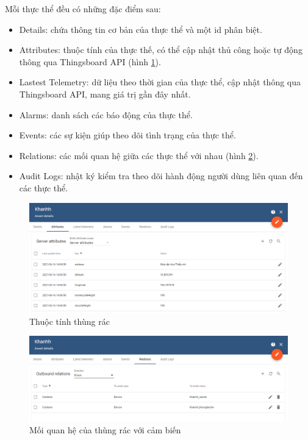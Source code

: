 Mỗi thực thể đều có những đặc điểm sau:
\begin{itemize}
    \item Details: chứa thông tin cơ bản của thực thể và một id phân biệt.
    \item Attributes: thuộc tính của thực thế, có thể cập nhật thủ công hoặc tự động thông qua Thingsboard API (hình \ref{fig:asset_attributes}).
    \item Lastest Telemetry: dữ liệu theo thời gian của thực thể, cập nhật thông qua Thingsboard API, mang giá trị gần đây nhất.
    \item Alarms: danh sách các báo động của thực thể.
    \item Events: các sự kiện giúp theo dõi tình trạng của thực thể.
    \item Relations: các mối quan hệ giữa các thực thể với nhau (hình \ref{fig:asset_relation}).
    \item Audit Logs: nhật ký kiểm tra theo dõi hành động người dùng liên quan đến các thực thể.
\end{itemize} 
\begin{figure}[H]
    \centering
    \includegraphics[width=\textwidth]{images/Khanh/Thingsboard/Asset_details.PNG}
    \caption{Thuộc tính thùng rác}
    \label{fig:asset_attributes}
\end{figure}
\begin{figure}[H]
    \centering
    \includegraphics[width=\textwidth]{images/Khanh/Thingsboard/Asset_relation.PNG}
    \caption{Mối quan hệ của thùng rác với cảm biến}
    \label{fig:asset_relation}
\end{figure}

